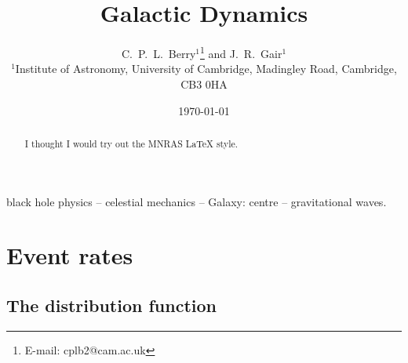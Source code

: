 \documentclass[useAMS,usedcolumn,usegraphicx,usenatbib]{mn2e}
\title[Galactic Dynamics]{Galactic Dynamics}
\author[C.\ P.\ L.\ Berry and J.\ R.\ Gair]{C.\ P.\ L.\ Berry$^{1}$\thanks{E-mail:
cplb2@cam.ac.uk}  and J.\ R.\ Gair$^{1}$\\
$^{1}$Institute of Astronomy, University of Cambridge, Madingley Road, Cambridge, CB3 0HA}
\begin{document}
\date{\today}

\pagerange{\pageref{firstpage}--\pageref{lastpage}} 

\maketitle

\label{firstpage}

\begin{abstract}
I thought I would try out the MNRAS \LaTeX{} style.
\end{abstract}

\begin{keywords}
black hole physics -- celestial mechanics -- Galaxy: centre -- gravitational waves.
\end{keywords}

\section{Event rates}

\subsection{The distribution function}
\end{document}
